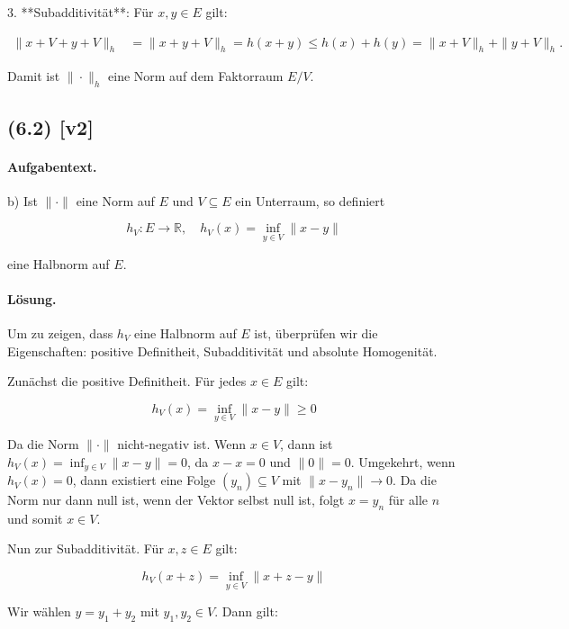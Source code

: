 \documentclass[11pt,a4paper]{article}
\begin{document}
3. **Subadditivität**: Für $x, y \in E$ gilt:

\begin{align*}
\|x + V + y + V\|_h &= \|x + y + V\|_h = h(x + y) \leq h(x) + h(y) = \|x + V\|_h + \|y + V\|_h.
\end{align*}

Damit ist $\|\cdot\|_h$ eine Norm auf dem Faktorraum $E / V$.


\subsection*{(6.2) [v2]}
\paragraph{Aufgabentext.}
b) Ist $\|\cdot\|$ eine Norm auf $E$ und $V \subseteq E$ ein Unterraum, so definiert

$$
h_V: E \rightarrow \mathbb{R}, \quad h_V(x)=\inf _{y \in V}\|x-y\|
$$

eine Halbnorm auf $E$.

\paragraph{Lösung.}
Um zu zeigen, dass \( h_V \) eine Halbnorm auf \( E \) ist, überprüfen wir die Eigenschaften: positive Definitheit, Subadditivität und absolute Homogenität.

Zunächst die positive Definitheit. Für jedes \( x \in E \) gilt:

\[
h_V(x) = \inf_{y \in V} \|x - y\| \geq 0
\]

Da die Norm \(\|\cdot\|\) nicht-negativ ist. Wenn \( x \in V \), dann ist \( h_V(x) = \inf_{y \in V} \|x - y\| = 0 \), da \( x - x = 0 \) und \(\|0\| = 0\). Umgekehrt, wenn \( h_V(x) = 0 \), dann existiert eine Folge \((y_n) \subseteq V\) mit \(\|x - y_n\| \to 0\). Da die Norm nur dann null ist, wenn der Vektor selbst null ist, folgt \( x = y_n \) für alle \( n \) und somit \( x \in V \).

Nun zur Subadditivität. Für \( x, z \in E \) gilt:

\[
h_V(x + z) = \inf_{y \in V} \|x + z - y\|
\]

Wir wählen \( y = y_1 + y_2 \) mit \( y_1, y_2 \in V \). Dann gilt:
\end{document}
